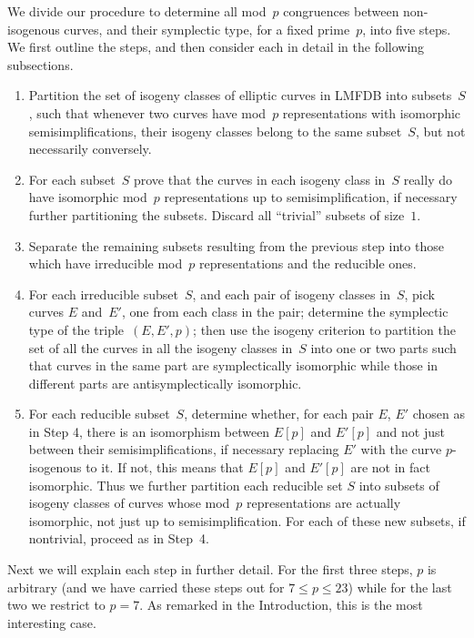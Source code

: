 \documentclass[12pt]{amsart}
\numberwithin{equation}{section}
\theoremstyle{definition}
\theoremstyle{remark}
\begin{document}
We divide our procedure to determine all mod~$p$ congruences between
non-isogenous curves, and their symplectic type, for a fixed
prime~$p$, into five steps.  We first outline the steps, and then
consider each in detail in the following subsections.
\begin{enumerate}[1.]
\item Partition the set of isogeny classes of elliptic curves in LMFDB
  into subsets~$S$, such that whenever two curves have mod~$p$
  representations with isomorphic semisimplifications, their isogeny
  classes belong to the same subset~$S$, but not necessarily
  conversely.
\item For each subset~$S$ prove that the curves in each isogeny class in~$S$ really
  do have isomorphic mod~$p$ representations up to
  semisimplification, if necessary further partitioning the subsets.
  Discard all ``trivial'' subsets of size~$1$.
\item Separate the remaining subsets resulting from the previous
  step into those which have irreducible mod~$p$ representations and
  the reducible ones.
\item For each irreducible subset~$S$, and each pair of isogeny
  classes in~$S$, pick curves $E$ and~$E'$, one from each class in the
  pair; determine the symplectic type of the triple~$(E,E',p)$; then
  use the isogeny criterion to partition the set of all the curves in
  all the isogeny classes in~$S$ into one or two parts such that curves
  in the same part are symplectically isomorphic while those in
  different parts are antisymplectically isomorphic.
\item For each reducible subset~$S$, determine whether, for each pair
  $E$, $E'$ chosen as in Step 4, there is an isomorphism between
  $E[p]$ and $E'[p]$ and not just between their semisimplifications,
  if necessary replacing $E'$ with the curve $p$-isogenous to it.  If
  not, this means that $E[p]$ and $E'[p]$ are not in fact isomorphic.
  Thus we further partition each reducible set $S$ into subsets of
  isogeny classes of curves whose mod~$p$ representations are actually
  isomorphic, not just up to semisimplification.  For each of these
  new subsets, if nontrivial, proceed as in Step~4.

\end{enumerate}
Next we will explain each step in further detail.  For the first three
steps, $p$ is arbitrary (and we have carried these steps out for $7\le
p\le23$) while for the last two we restrict to $p=7$. As remarked in
the Introduction, this is the most interesting case.
\end{document}
